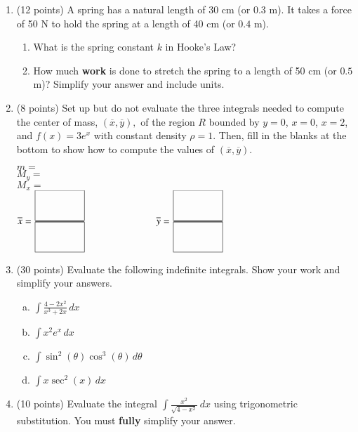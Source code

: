 \documentclass[12pt]{article}
\renewcommand{\emph}[1]{\textsf{\textbf{#1}}}
\begin{document}
\begin{enumerate}
\pagebreak

\item (12 points) A spring has a natural length of 30 cm (or $0.3$ m). It takes a force of 50 N to hold the spring at a length of 40 cm (or $0.4$ m). \\
\begin{enumerate}
	\item What is the spring constant $k$ in Hooke's Law?
	\vfill
	\item How much \textbf{work} is done to stretch the spring to a length of 50 cm  (or $0.5$ m)? Simplify your answer and include units.
	\vfill
	\end{enumerate}
\vfill 

\item (8 points) Set up but do not evaluate the three integrals needed to compute the center of mass, $(\overline{x},\overline{y}),$ of the region $R$ bounded by $y=0$, $x=0$, $x=2$, and $f(x)=3e^x$ with constant density $\rho=1.$ Then, fill in the blanks at the bottom to show how to compute the values of $(\overline{x},\overline{y}).$ 

\vfill
{\Large{$m=$}}\\

\vfill
{\Large{$M_y=$}}\\

\vfill
{\Large{$M_x=$}}\\

\vfill
{\Large{$\overline{x}=\frac{\framebox(50,30){}}{\framebox(50,30){}} \hspace{1in} \overline{y}=\frac{\framebox(50,30){}}{\framebox(50,30){}}$}}

\pagebreak

\item (30 points) Evaluate the following indefinite integrals. Show your work and simplify your answers.
\begin{enumerate}[(a)]
\item $\displaystyle \int \frac{4-2x^2}{x^3+2x}\,dx$
\vfill
\item $\displaystyle \int x^2e^x \,dx$
\vfill
\newpage
\item $\displaystyle \int \sin^2 (\theta) \cos^3 (\theta) \,d\theta$
\vfill
\item $\displaystyle \int x\sec^2(x) \,dx$
\vfill
\end{enumerate}

\pagebreak

\item (10 points) Evaluate the integral $\displaystyle \int \frac{x^2}{\sqrt{4-x^2}} \: dx$ using trigonometric substitution. You must \emph{fully} simplify your answer.\\

\vfill

\end{enumerate}
\end{document}
